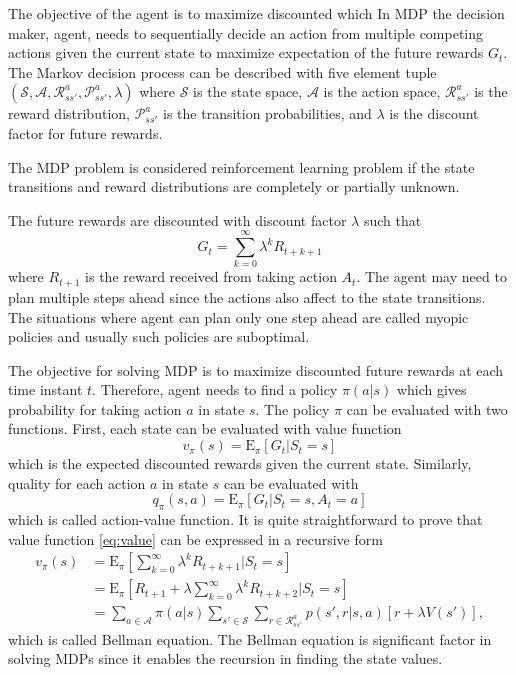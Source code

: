 \documentclass[11pt,a4paper]{article}
\newcommand{\Epolicy}[1]{\mathrm{E}_\pi \left[ #1 \right]}
\newcommand{\Ss}{\mathcal{S}}
\newcommand{\As}{\mathcal{A}}
\newcommand{\Rs}{\mathcal{R}_{ss'}^a}
\newcommand{\Pt}{\mathcal{P}_{ss'}^a}
\begin{document}
The objective of the agent is to maximize discounted which  
In MDP the decision maker, agent, needs to sequentially decide an action from multiple competing actions given the current state to maximize expectation of the future rewards $G_t$.
The Markov decision process can be described with five element tuple $\left( \Ss, \As, \Rs, \Pt, \lambda \right)$ where $\Ss$ is the state space, $\As$ is the action space, $\Rs$ is the reward distribution, $\Pt$ is the transition probabilities, and $\lambda$ is the discount factor for future rewards.

The MDP problem is considered reinforcement learning problem if the state transitions and reward distributions are completely or partially unknown. 

The future rewards are discounted with discount factor $\lambda$ such that
\begin{equation}
    G_t = \sum_{k=0}^{\infty} \lambda^k R_{t + k + 1}
\end{equation}
where $R_{t+1}$ is the reward received from taking action $A_t$.
The agent may need to plan multiple steps ahead since the actions also affect to the state transitions.
The situations where agent can plan only one step ahead are called myopic policies and usually such policies are suboptimal.



The objective for solving MDP is to maximize discounted future rewards at each time instant $t$.
Therefore, agent needs to find a policy $\pi(a | s)$ which gives probability for taking action $a$ in state $s$.
The policy $\pi$ can be evaluated with two functions. 
First, each state can be evaluated with value function
\begin{equation} \label{eq:value}
    v_\pi(s) = \Epolicy{G_t | S_t=s}
\end{equation}
which is the expected discounted rewards given the current state.
Similarly, quality for each action $a$ in state $s$ can be evaluated with
\begin{equation}
    q_\pi(s, a) = \Epolicy{G_t | S_t=s, A_t=a}
\end{equation}
which is called action-value function.
It is quite straightforward to prove that value function \eqref{eq:value} can be expressed in a recursive form 
\begin{align}
    v_\pi(s) 
    &= \Epolicy{ \sum_{k=0}^{\infty} \lambda^k R_{t + k + 1} | S_t=s} \\
    &= \Epolicy{R_{t + 1} + \lambda \sum_{k=0}^{\infty} \lambda^k R_{t + k + 2} | S_t=s} \\
    &= \sum_{a \in \As} \pi(a | s) \sum_{s' \in \Ss} \sum_{r \in \Rs} p(s', r | s, a) \left[ r + \lambda V(s') \right]\label{eq:bellman},
\end{align}
which is called Bellman equation.
The Bellman equation is significant factor in solving MDPs since it enables the recursion in finding the state values.
\end{document}
